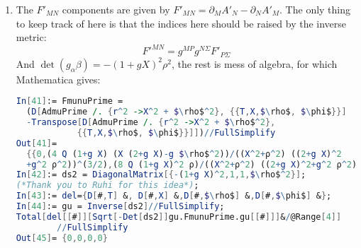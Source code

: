 \documentclass[12pt,a4]{article}
\begin{document}
\begin{enumerate}
\begin{enumerate}
\begin{figure}[H]
          \caption{Equipotentials for the accelerating charge in an orthonormal coordinate system}
          \label{fig:equipgraphs}
        \end{figure}
        Figure~\ref{fig:equipgraphs} shows that the graphs seem streched out to the left and compressed to the right.
        The electric field will be weaker at points in the direction opposite to the charge's motion and stronger at points that are to the right of the charge.
        In the exreme cases of high $g$ the potential is constant to the left of the charge indicating that there will be no electric field to the left of the charge.
        This occurence is (probably) equivalent to the fact that no light escape regions of high enough gravitational acceleration.
        With $g$ low and zero, the equipotentials become circles reducting to the static limit.
      \item
        The $F'_{M N}$ components are given by $F'_{MN} = \partial_{M}A'_N - \partial_{N}A'_M$.
        The only thing to keep track of here is that the indices here should be raised by the inverse metric:
        \begin{equation*}
          F'^{M N} = g^{M P}g^{N\Sigma}F'_{P\Sigma}
        \end{equation*}
        And $\det (g_\alpha \beta) = -(1 + gX)^2\rho^2$, the rest is mess of algebra, for which Mathematica gives:
        
        \begin{lstlisting}[language=Mathematica, mathescape]
In[41]:= FmunuPrime =
  (D[AdmuPrime /. {r^2 ->X^2 + $\rho$^2}, {{T,X,$\rho$, $\phi$}}] 
  -Transpose[D[AdmuPrime /. {r^2 ->X^2 + $\rho$^2}, 
            {{T,X,$\rho$, $\phi$}}]])//FullSimplify
Out[41]= 
  {{0,(4 Q (1+g X) (X (2+g X)-g $\rho$^2))/((X^2+ρ^2) ((2+g X)^2
  +g^2 ρ^2))^(3/2),(8 Q (1+g X)^2 ρ)/((X^2+ρ^2) ((2+g X)^2+g^2 ρ^2))^(3/2),0},{-((4 Q (1+g X) (X (2+g X)-g ρ^2))/((X^2+ρ^2) ((2+g X)^2+g^2 ρ^2))^(3/2)),0,0,0},{-((8 Q (1+g X)^2 ρ)/((X^2+ρ^2) ((2+g X)^2+g^2 ρ^2))^(3/2)),0,0,0},{0,0,0,0}}
In[42]:= ds2 = DiagonalMatrix[{-(1+g X)^2,1,1,$\rho$^2}];
(*Thank you to Ruhi for this idea*);
In[43]:= del={D[#,T] &, D[#,X] &,D[#,$\rho$] &,D[#,$\phi$] &}; 
In[44]:= gu = Inverse[ds2]//FullSimplify;
Total[del[[#]][Sqrt[-Det[ds2]]gu.FmunuPrime.gu[[#]]]&/@Range[4]]
        //FullSimplify
Out[45]= {0,0,0,0}
        \end{lstlisting}
    \end{enumerate}
\end{enumerate}
\end{document}
